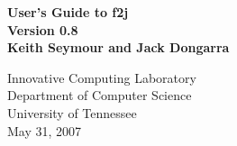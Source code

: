 \thispagestyle{empty}
\begin{center}
\huge
\bf
User's Guide to f2j \\
Version 0.8
\vspace*{1in} \mbox{} \\
\LARGE \rm
Keith Seymour and Jack Dongarra 

\vspace*{.5in}
Innovative Computing Laboratory\\
Department of Computer Science\\
University of Tennessee\\
\vspace*{.5in}
May 31, 2007
\end{center}
